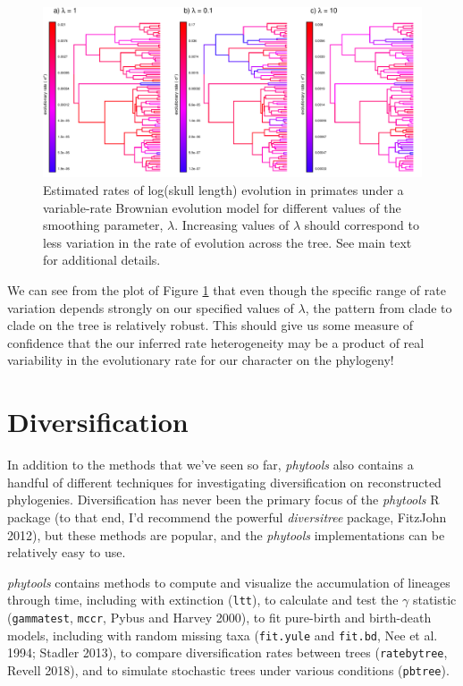 \documentclass[fleqn,10pt,lineno]{wlpeerj} %
\begin{document}
\begin{figure}
\includegraphics[width=1\linewidth]{Revell.phytools-v2_peerj_files/figure-latex/multirateBM-1} \caption{Estimated rates of log(skull length) evolution in primates under a variable-rate Brownian evolution model for different values of the smoothing parameter, $\lambda$. Increasing values of $\lambda$ should correspond to less variation in the rate of evolution across the tree. See main text for additional details.}\label{fig:multirateBM}
\end{figure}

We can see from the plot of Figure \ref{fig:multirateBM} that even though the specific range of rate variation depends strongly on our specified values of \(\lambda\), the pattern from clade to clade on the tree is relatively robust. This should give us some measure of confidence that the our inferred rate heterogeneity may be a product of real variability in the evolutionary rate for our character on the phylogeny!

\hypertarget{diversification}{%
\section{Diversification}\label{diversification}}

In addition to the methods that we've seen so far, \emph{phytools} also contains a handful of different techniques for investigating diversification on reconstructed phylogenies. Diversification has never been the primary focus of the \emph{phytools} R package (to that end, I'd recommend the powerful \emph{diversitree} package, FitzJohn 2012), but these methods are popular, and the \emph{phytools} implementations can be relatively easy to use.

\emph{phytools} contains methods to compute and visualize the accumulation of lineages through time, including with extinction (\texttt{ltt}), to calculate and test the \(\gamma\) statistic (\texttt{gammatest}, \texttt{mccr}, Pybus and Harvey 2000), to fit pure-birth and birth-death models, including with random missing taxa (\texttt{fit.yule} and \texttt{fit.bd}, Nee et al. 1994; Stadler 2013), to compare diversification rates between trees (\texttt{ratebytree}, Revell 2018), and to simulate stochastic trees under various conditions (\texttt{pbtree}).
\end{document}
